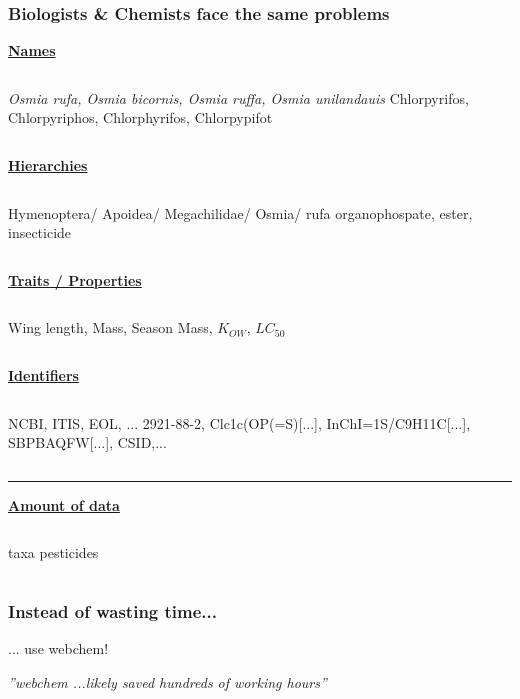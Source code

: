 \documentclass[
	10pt
	]{beamer}
\begin{document}
\begin{frame}
\frametitle{Biologists \& Chemists face the same problems}
	\small
	\centering
	\pause
	\textbf{\alert{\underline{Names}}}
	\begin{columns}[t]
	\emph{Osmia rufa, Osmia bicornis, Osmia ruffa, Osmia unilandauis} 
	Chlorpyrifos, Chlorpyriphos, Chlorphyrifos, Chlorpypifot
	\end{columns}
	\pause

	\centering
	\textbf{\alert{\underline{Hierarchies}}}
	\begin{columns}[t]
	Hymenoptera/ Apoidea/ Megachilidae/ Osmia/ rufa 
	organophospate, ester, insecticide
	\end{columns}
	\pause

	\centering
	\textbf{\alert{\underline{Traits / Properties}}}
	\begin{columns}[t]
	Wing length, Mass, Season 
	Mass, $K_{OW}$, $LC_{50}$
	\end{columns}
	\pause

	\centering
	\textbf{\alert{\underline{Identifiers}}}
	\begin{columns}[t]
	NCBI, ITIS, EOL, ... 
	2921-88-2, Clc1c(OP(=S)[...], InChI=1S/C9H11C[...], SBPBAQFW[...], CSID,...
	\end{columns}
	\vspace{0.8em}
	\pause

	\rule{\textwidth}{1pt}
	\textbf{\alert{\underline{Amount of data}}}

	\begin{columns}[t]
	 taxa
	 pesticides
	\end{columns}
\end{frame}



{%
\begin{frame}{}
\frametitle{Instead of wasting time...}
... use \alert{webchem}! \\	\vspace*{-0.5cm}
	\hspace*{2cm}
	\begin{adjustbox}{max totalsize={\textwidth}{0.9\textheight}}
				
	\end{adjustbox}

\pause
\vspace*{-1cm}\emph{''\alert{webchem} ...likely saved hundreds of working hours''}
\end{frame}
}
\end{document}
